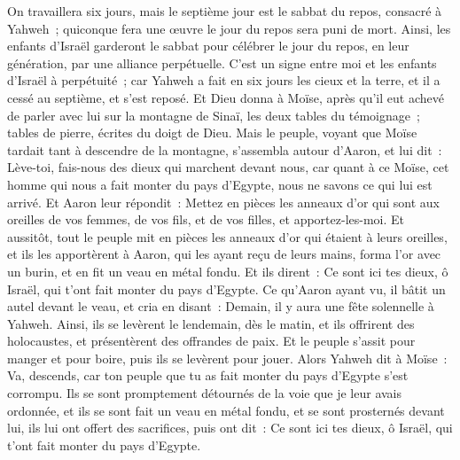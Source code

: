 \begin{multicols}{2}
On travaillera six jours, mais le septième jour est le sabbat du repos, consacré à Yahweh~; quiconque fera une œuvre le jour du repos sera puni de mort.
Ainsi, les enfants d'Israël garderont le sabbat pour célébrer le jour du repos, en leur génération, par une alliance perpétuelle.
C'est un signe entre moi et les enfants d'Israël à perpétuité~; car Yahweh a fait en six jours les cieux et la terre, et il a cessé au septième, et s'est reposé.
Et Dieu donna à Moïse, après qu'il eut achevé de parler avec lui sur la montagne de Sinaï, les deux tables du témoignage~; tables de pierre, écrites du doigt de Dieu.
\VerseOne{}Mais le peuple, voyant que Moïse tardait tant à descendre de la montagne, s'assembla autour d'Aaron, et lui dit~: Lève-toi, fais-nous des dieux qui marchent devant nous, car quant à ce Moïse, cet homme qui nous a fait monter du pays d'Egypte, nous ne savons ce qui lui est arrivé.
Et Aaron leur répondit~: Mettez en pièces les anneaux d'or qui sont aux oreilles de vos femmes, de vos fils, et de vos filles, et apportez-les-moi.
 Et aussitôt, tout le peuple mit en pièces les anneaux d'or qui étaient à leurs oreilles, et ils les apportèrent à Aaron, 
qui les ayant reçu de leurs mains, forma l'or avec un burin, et en fit un veau en métal fondu. Et ils dirent~: Ce sont ici tes dieux, ô Israël, qui t'ont fait monter du pays d'Egypte.
Ce qu'Aaron ayant vu, il bâtit un autel devant le veau, et cria en disant~: Demain, il y aura une fête solennelle à Yahweh.
Ainsi, ils se levèrent le lendemain, dès le matin, et ils offrirent des holocaustes, et présentèrent des offrandes de paix. Et le peuple s'assit pour manger et pour boire, puis ils se levèrent pour jouer.
Alors Yahweh dit à Moïse~: Va, descends, car ton peuple que tu as fait monter du pays d'Egypte s'est corrompu.
Ils se sont promptement détournés de la voie que je leur avais ordonnée, et ils se sont fait un veau en métal fondu, et se sont prosternés devant lui, ils lui ont offert des sacrifices, puis ont dit~: Ce sont ici tes dieux, ô Israël, qui t'ont fait monter du pays d'Egypte.

\end{multicols}
